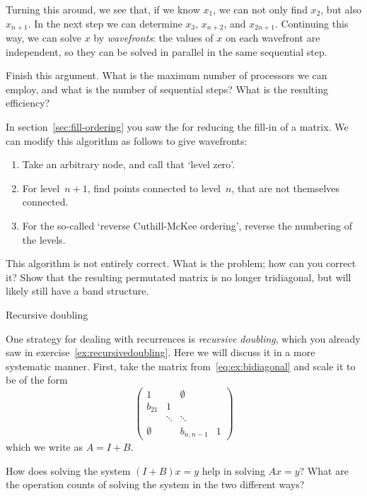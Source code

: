 Turning this around, we see that, if we know $x_1$, we can not only
find $x_2$, but also $x_{n+1}$. In the next step we can determine
$x_3$, $x_{n+2}$, and $x_{2n+1}$. Continuing this way, we can solve
$x$ by \emph{wavefronts}: the values of $x$ on each wavefront are
independent, so they can be solved in parallel in the same sequential
step.

\begin{exercise}
  Finish this argument. What is the maximum number of processors we
  can employ, and what is the number of sequential steps? What is the
  resulting efficiency?
\end{exercise}

In section~\ref{sec:fill-ordering} you saw the
 for reducing the fill-in of a
matrix. We can modify this algorithm as follows to give wavefronts:
\begin{enumerate}
\item Take an arbitrary node, and call that `level zero'.
\item For level~$n+1$, find points connected to
  level~$n$, that are not themselves connected.
\item For the so-called `reverse Cuthill-McKee ordering', reverse the
  numbering of the levels.
\end{enumerate}
\begin{exercise}
  This algorithm is not entirely correct. What is the problem; how can
  you correct it? Show that the resulting permutated matrix is no
  longer tridiagonal, but will likely still have a band structure.
\end{exercise}

 {Recursive doubling}

One strategy for dealing with recurrences is
\emph{recursive doubling}, which you already saw in
exercise~\ref{ex:recursivedoubling}. Here we will discuss it in a more
systematic manner. First, take the matrix
from~\eqref{eq:ex:bidiagonal} and scale it to be of the form
\[ 
  \begin{pmatrix}
    1&&\emptyset\\ b_{21}&1\\ &\ddots&\ddots\\ 
    \emptyset&&b_{n,n-1}&1
  \end{pmatrix}
\]
which we write as $A=I+B$.

\begin{exercise}
  How does solving the system $(I+B)x=y$ help in solving $Ax=y$? What
  are the operation counts of solving the system in the two different ways?
\end{exercise}

